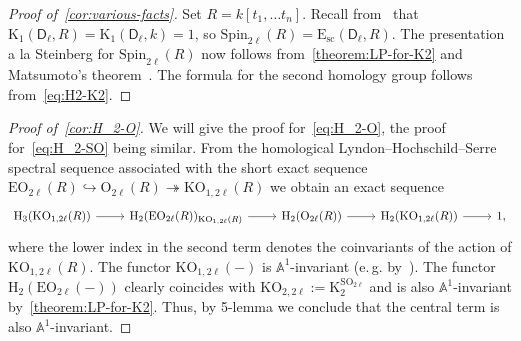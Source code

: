 \documentclass[oneside, 11pt]{amsart} \pdfoutput=1
\newcommand{\K}{{\mathrm{K}}}
\newcommand{\E}{\mathrm{E}}
\numberwithin{equation}{section}
\theoremstyle{definition}
\newcommand{\rD}{\mathsf{D}}
\begin{document}
\begin{proof}[Proof of~\cref{cor:various-facts}]
  Set $R = k[t_1,\ldots t_n]$. Recall from~\cite{Abe83} that $\K_1(\rD_\ell, R) = \K_1(\rD_\ell, k) = 1$, so $\mathrm{Spin}_{2\ell}(R) = \E_\mathrm{sc}(\rD_\ell, R)$. The presentation a la Steinberg for $\mathrm{Spin}_{2\ell}(R)$ now follows from~\cref{theorem:LP-for-K2} and Matsumoto's theorem~\cite[Theorem~5.10]{Ma69}. The formula for the second homology group follows from~\eqref{eq:H2-K2}. \end{proof}
 
 \begin{proof}[Proof of~\cref{cor:H_2-O}]
  We will give the proof for~\eqref{eq:H_2-O}, the proof for~\eqref{eq:H_2-SO} being similar.
  From the homological Lyndon--Hochschild--Serre spectral sequence associated with the short exact sequence $\mathrm{EO}_{2\ell}(R) \hookrightarrow \mathrm{O}_{2\ell}(R) \twoheadrightarrow \mathrm{KO}_{1, 2\ell}(R)$ we obtain an exact sequence
  \[ \begin{tikzcd} \mathrm H_3(\mathrm{KO}_{1,2\ell}(R)) \ar[r] & \mathrm H_2(\mathrm{EO}_{2\ell}(R))_{\mathrm{KO}_{1,2\ell}(R)} \ar[r] & \mathrm H_2(\mathrm{O}_{2\ell}(R)) \ar[r] &  \mathrm H_2(\mathrm{KO}_{1, 2\ell}(R)) \ar[r] & 1, \end{tikzcd} \]
  where the lower index in the second term denotes the coinvariants of the action of $\mathrm{KO}_{1,2\ell}(R)$.
  The functor $\mathrm{KO}_{1, 2\ell}(-)$ is $\mathbb{A}^1$-invariant (e.\,g. by~\cite[Theorem~1.1]{Sta20}).
  The functor $\mathrm H_2(\mathrm{EO}_{2\ell}(-))$ clearly coincides with $\mathrm{KO}_{2, 2\ell} := \K_2^{\mathrm {SO}_{2\ell}}$ and is also $\mathbb{A}^1$-invariant by~\cref{theorem:LP-for-K2}. Thus, by 5-lemma we conclude that the central term is also $\mathbb{A}^1$-invariant.
 \end{proof}
 
\end{document}
